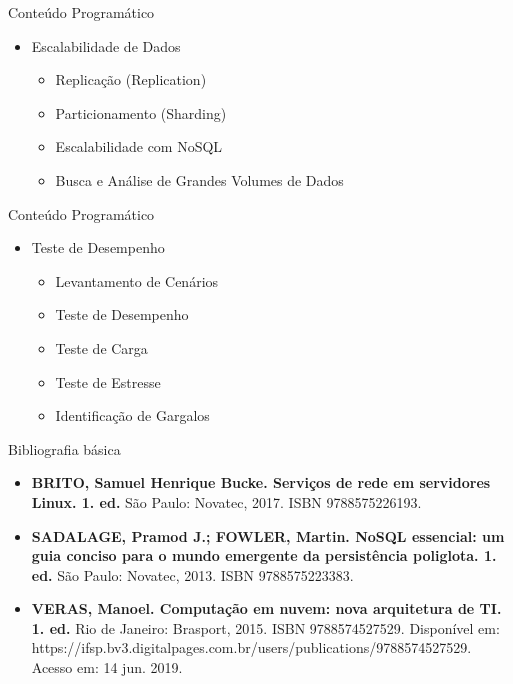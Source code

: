 \documentclass{beamer}
\begin{document}
\begin{frame}{Conteúdo Programático}\justifying
      \begin{itemize}
            \item Escalabilidade de Dados
            \begin{itemize}
                  \item Replicação (Replication)
                  \item Particionamento (Sharding) 
                  \item Escalabilidade com NoSQL
                  \item Busca e Análise de Grandes Volumes de Dados 
            \end{itemize}
           
      \end{itemize}
\end{frame}
\begin{frame}{Conteúdo Programático}\justifying
      \begin{itemize}
            \item Teste de Desempenho
            \begin{itemize}
                  \item Levantamento de Cenários
                  \item Teste de Desempenho
                  \item Teste de Carga
                  \item Teste de Estresse
                  \item Identificação de Gargalos
            \end{itemize}
           
      \end{itemize}
\end{frame}

\begin{frame}{Bibliografia básica}\justifying
      \begin{itemize}
            \item \textbf{BRITO, Samuel Henrique Bucke. \textcolor{sintefdarkgreen}{Serviços de rede em servidores Linux. 1. ed.}} São Paulo: Novatec, 2017. ISBN 9788575226193.
            \item \textbf{ SADALAGE, Pramod J.; FOWLER, Martin. \textcolor{sintefdarkgreen}{NoSQL essencial: um guia conciso para o mundo emergente da persistência poliglota. 1. ed.}} São Paulo: Novatec, 2013. ISBN 9788575223383.
            \item \textbf{ VERAS, Manoel. \textcolor{sintefdarkgreen}{Computação em nuvem: nova arquitetura de TI. 1. ed.}} Rio de Janeiro: Brasport, 2015. ISBN 9788574527529. Disponível em: https://ifsp.bv3.digitalpages.com.br/users/publications/9788574527529. Acesso em: 14 jun. 2019.     
      \end{itemize}
\end{frame}
      
\end{document}
